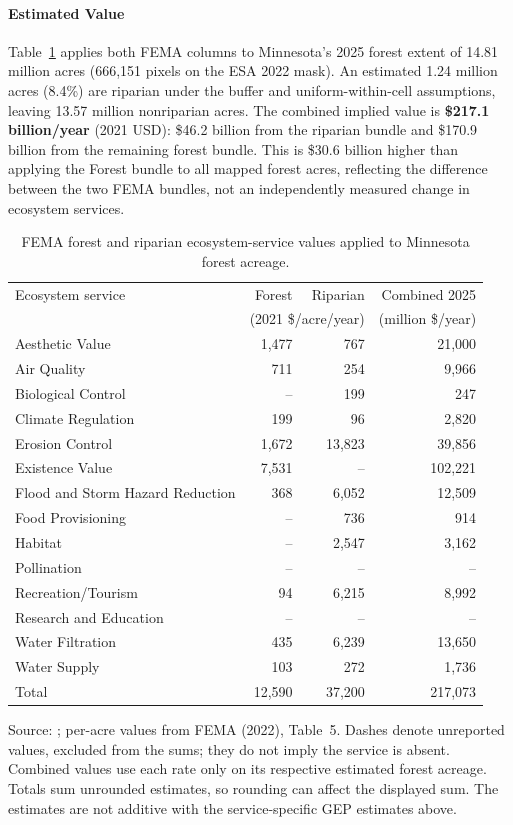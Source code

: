 \documentclass[11pt]{article}
\begin{document}
\paragraph{Estimated Value}
Table~\ref{tab:fema-implied} applies both FEMA columns to Minnesota's 2025 forest extent of 14.81 million acres (666,151 pixels on the ESA 2022 mask). An estimated 1.24 million acres (8.4\%) are riparian under the buffer and uniform-within-cell assumptions, leaving 13.57 million nonriparian acres. The combined implied value is \textbf{\$217.1 billion/year} (2021 USD): \$46.2 billion from the riparian bundle and \$170.9 billion from the remaining forest bundle. This is \$30.6 billion higher than applying the Forest bundle to all mapped forest acres, reflecting the difference between the two FEMA bundles, not an independently measured change in ecosystem services.

\begin{table}[htbp]
\centering
\caption{FEMA forest and riparian ecosystem-service values applied to Minnesota forest acreage.}
\label{tab:fema-implied}
\small
\begin{tabular}{@{}lrrr@{}}
\toprule
Ecosystem service & Forest & Riparian & Combined 2025 \\
 & \multicolumn{2}{c}{(2021 \$/acre/year)} & (million \$/year) \\
\midrule
Aesthetic Value & 1,477 & 767 & 21,000 \\
Air Quality & 711 & 254 & 9,966 \\
Biological Control & -- & 199 & 247 \\
Climate Regulation & 199 & 96 & 2,820 \\
Erosion Control & 1,672 & 13,823 & 39,856 \\
Existence Value & 7,531 & -- & 102,221 \\
Flood and Storm Hazard Reduction & 368 & 6,052 & 12,509 \\
Food Provisioning & -- & 736 & 914 \\
Habitat & -- & 2,547 & 3,162 \\
Pollination & -- & -- & -- \\
Recreation/Tourism & 94 & 6,215 & 8,992 \\
Research and Education & -- & -- & -- \\
Water Filtration & 435 & 6,239 & 13,650 \\
Water Supply & 103 & 272 & 1,736 \\
\midrule
Total & 12,590 & 37,200 & 217,073 \\
\bottomrule
\end{tabular}

\smallskip
\begin{minipage}{0.95\linewidth}
\footnotesize Source: ; per-acre values from FEMA (2022), Table~5. Dashes denote unreported values, excluded from the sums; they do not imply the service is absent. Combined values use each rate only on its respective estimated forest acreage. Totals sum unrounded estimates, so rounding can affect the displayed sum. The estimates are not additive with the service-specific GEP estimates above.
\end{minipage}
\end{table}
\end{document}
